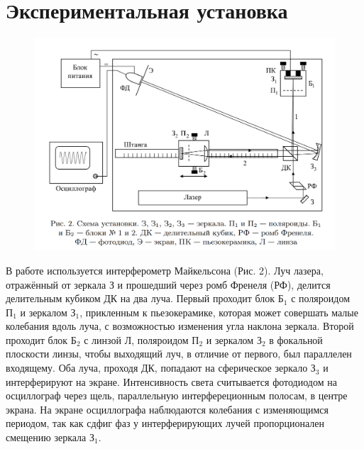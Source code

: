 \documentclass[12pt, a4paper]{article}
\begin{document}
\section{Экспериментальная установка}
\begin{figure}[H]
    \begin{center}
        \includegraphics[scale=0.9]{pics/setup.png}
    \end{center}
\end{figure}

В работе используется интерферометр Майкельсона (Рис. 2). Луч лазера,
отражённый от зеркала З и прошедший через ромб Френеля (РФ), делится
делительным кубиком ДК на два луча. Первый проходит блок $\text{Б}_1$ с
поляроидом $\text{П}_1$ и зеркалом $\text{З}_1$, прикленным к пьезокерамике,
которая может совершать малые колебания вдоль луча, с возможностью изменения
угла наклона зеркала. Второй проходит блок $\text{Б}_2$ с линзой Л, поляроидом
$\text{П}_2$ и зеркалом $\text{З}_2$ в фокальной плоскости линзы, чтобы
выходящий луч, в отличие от первого, был параллелен входящему. Оба луча,
проходя ДК, попадают на сферическое зеркало $\text{З}_3$ и интерферируют на
экране. Интенсивность света считывается фотодиодом на осциллограф через щель,
параллельную интерфереционным полосам, в центре экрана. На экране осциллографа
наблюдаются колебания с изменяющимся периодом, так как сдфиг фаз у
интерферирующих лучей пропорционален смещению зеркала $\text{З}_1$.
\end{document}
